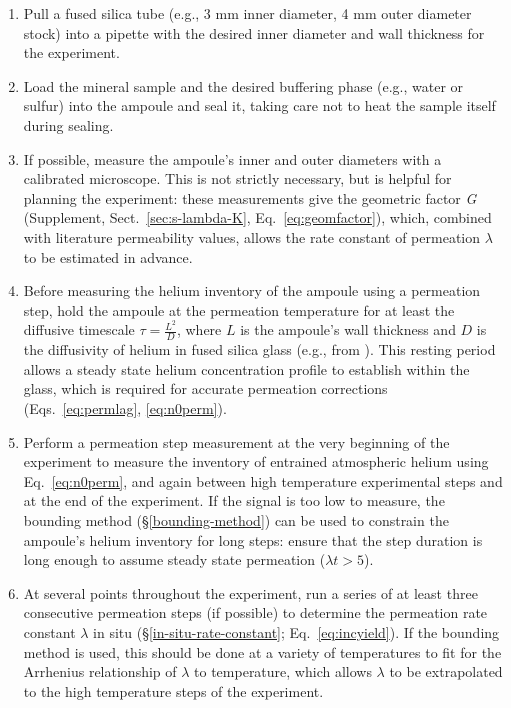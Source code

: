 \begin{enumerate}
  \item Pull a fused silica tube (e.g., 3 mm inner diameter, 4 mm outer diameter stock) into a pipette with the desired inner diameter and wall thickness for the experiment.
  \item Load the mineral sample and the desired buffering phase (e.g., water or sulfur) into the ampoule and seal it, taking care not to heat the sample itself during sealing.
  \item If possible, measure the ampoule's inner and outer diameters with a calibrated microscope. This is not strictly necessary, but is helpful for planning the experiment: these measurements give the geometric factor \emph{G} (Supplement, Sect.~\ref{sec:s-lambda-K}, Eq.~\eqref{eq:geomfactor}), which, combined with literature permeability values, allows the rate constant of permeation $\lambda$ to be estimated in advance.
  \item Before measuring the helium inventory of the ampoule using a permeation step, hold the ampoule at the permeation temperature for at least the diffusive timescale \(\tau = \frac{L^{2}}{D}\), where \(L\) is the ampoule's wall thickness and \(D\) is the diffusivity of helium in fused silica glass (e.g., from \citealp{swets1961}). This resting period allows a steady state helium concentration profile to establish within the glass, which is required for accurate permeation corrections (Eqs.~\eqref{eq:permlag}, \eqref{eq:n0perm}).
  \item Perform a permeation step measurement at the very beginning of the experiment to measure the inventory of entrained atmospheric helium using Eq.~\eqref{eq:n0perm}, and again between high temperature experimental steps and at the end of the experiment. If the signal is too low to measure, the bounding method (\S\ref{bounding-method}) can be used to constrain the ampoule's helium inventory for long steps: ensure that the step duration is long enough to assume steady state permeation (\(\lambda t > 5\)).
  \item At several points throughout the experiment, run a series of at least three consecutive permeation steps (if possible) to determine the permeation rate constant $\lambda$ in situ (\S\ref{in-situ-rate-constant}; Eq.~\eqref{eq:incyield}). If the bounding method is used, this should be done at a variety of temperatures to fit for the Arrhenius relationship of $\lambda$ to temperature, which allows $\lambda$ to be extrapolated to the high temperature steps of the experiment. 
\end{enumerate}